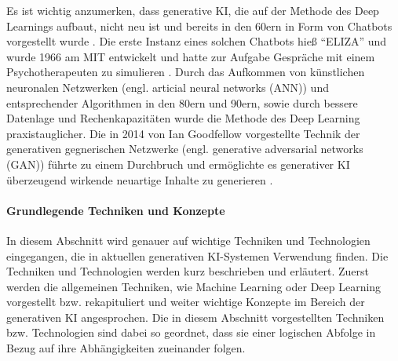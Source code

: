 Es ist wichtig anzumerken, dass generative KI, die auf der Methode des Deep Learnings aufbaut, nicht neu ist und bereits in den 60ern in Form von Chatbots vorgestellt wurde \cite{gen-ai-tech-target}.
Die erste Instanz eines solchen Chatbots hieß \enquote{ELIZA} \cite{eliza} und wurde 1966 am MIT entwickelt und hatte zur Aufgabe Gespräche mit einem Psychotherapeuten zu simulieren \cite{computer-woche-genai}.
Durch das Aufkommen von künstlichen neuronalen Netzwerken (engl. articial neural networks (ANN)) und entsprechender Algorithmen in den 80ern und 90ern, sowie durch bessere Datenlage und Rechenkapazitäten wurde die Methode des Deep Learning praxistauglicher.
Die in 2014 von Ian Goodfellow vorgestellte Technik der generativen gegnerischen Netzwerke (engl. generative adversarial networks (GAN)) führte zu einem Durchbruch und ermöglichte es generativer KI überzeugend wirkende neuartige Inhalte zu generieren \cite{medium-genai-history}.

\paragraph{Grundlegende Techniken und Konzepte}
\label{sec2:sota:par:basic-concepts}
In diesem Abschnitt wird genauer auf wichtige Techniken und Technologien eingegangen, die in aktuellen generativen KI-Systemen Verwendung finden.
Die Techniken und Technologien werden kurz beschrieben und erläutert.
Zuerst werden die allgemeinen Techniken, wie Machine Learning oder Deep Learning vorgestellt bzw. rekapituliert und weiter wichtige Konzepte im Bereich der generativen KI angesprochen.
Die in diesem Abschnitt vorgestellten Techniken bzw. Technologien sind dabei so geordnet, dass sie einer logischen Abfolge in Bezug auf ihre Abhängigkeiten zueinander folgen.

